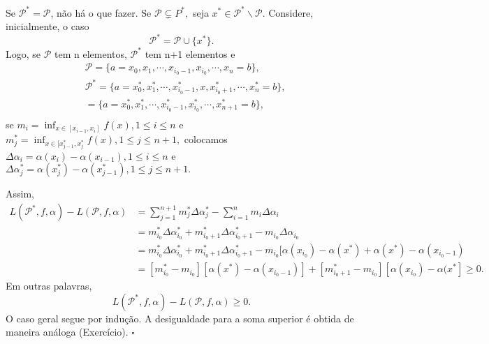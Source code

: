 \documentclass[analysis_notes.tex]{subfiles}
\begin{document}
\begin{proof*}
	Se \(\mathcal{P}^{*} = \mathcal{P}\), não há o que fazer. Se \(\mathcal{P}\subsetneq{P}^{*},\) seja \(x^{*}\in \mathcal{P}^{*}\backslash \mathcal{P}.\) Considere,
	inicialmente, o caso
	\[
		\mathcal{P}^{*} = \mathcal{P}\cup\{x^{*}\}.
	\]
	Logo, se \(\mathcal{P}\) tem n elementos, \(\mathcal{P}^{*}\) tem n+1 elementos e
	\begin{align*}
		 & \mathcal{P} = \{a = x_{0}, x_{1}, \cdots, x_{i_{0}-1}, x_{i_{0}}, \cdots, x_{n} = b\},                              \\
		 & \mathcal{P}^{*} = \{a = x_{0}^{*}, x_{1}^{*}, \cdots, x_{i_{0}-1}^{*}, x, x_{i_{0}+1}^{*}, \cdots, x_{n}^{*} = b\}, \\
		 & =\{a = x_{0}^{*}, x_{1}^{*}, \cdots, x_{i_{0}-1}^{*}, x_{i_{0}}^{*}, \cdots, x_{n+1}^{*} = b\},                     \\
	\end{align*}
	se \(m_{i} = \inf_{x\in[x_{i-1}, x_{i}]}f(x), 1\leq i\leq n\) e \(m_{j}^{*} = \inf_{x\in[x_{j-1}^{*}, x_{j}^{*}}f(x), 1\leq j\leq n+1,\) colocamos
	\(\Delta \alpha_{i} = \alpha (x_{i}) - \alpha (x_{i-1}), 1\leq i\leq n\) e \(\Delta \alpha_{j}^{*} = \alpha (x_{j}^{*}) - \alpha (x_{j-1}^{*}), 1\leq j\leq n+1.\)

	Assim,
	\begin{align*}
		L(\mathcal{P}^{*}, f, \alpha ) - L(\mathcal{P}, f, \alpha ) & = \sum\limits_{j=1}^{n+1}m_{j}^{*}\Delta \alpha_{j}^{*} - \sum\limits_{i=1}^{n}m_{i}\Delta \alpha_{i}                                                                        \\
		                                                            & = m_{i_{0}}^{*}\Delta \alpha_{i_{0}}^{*} + m_{i_{0}+1}^{*}\Delta \alpha _{i_{0}+1}^{*} - m_{i_{0}}\Delta \alpha _{i_{0}}                                                     \\
		                                                            & = m_{i_{0}}^{*}\Delta \alpha_{i_{0}}^{*} + m_{i_{0}+1}^{*}\Delta \alpha _{i_{0}+1}^{*} - m_{i_{0}}[\alpha (x_{i_{0}}) - \alpha (x^{*})+\alpha (x^{*}) - \alpha (x_{i_{0}-1}) \\
		                                                            & = [m_{i_{0}}^{*} - m_{i_{0}}][\alpha (x^{*}) - \alpha (x_{i_{0}-1})] + [m_{i_{0}+1}^{*} - m_{i_{0}}][\alpha (x_{i_{0}}) - \alpha (x^{*}]\geq 0.
	\end{align*}
	Em outras palavras,
	\[
		L(\mathcal{P}^{*}, f, \alpha ) - L(\mathcal{P}, f, \alpha )\geq 0.
	\]
	O caso geral segue por indu\c cão. A desigualdade para a soma superior é obtida de maneira análoga (Exercício). \(\square\)
\end{proof*}
\end{document}
